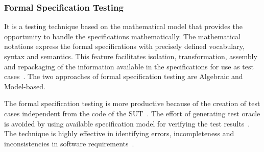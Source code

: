\subsubsection{Formal Specification Testing}
It is a testing technique based on the mathematical model that provides the opportunity to handle the specifications mathematically. The mathematical notations express the formal specifications with precisely defined vocabulary, syntax and semantics. This feature facilitates isolation, transformation, assembly and repackaging of the information available in the specifications for use as test cases~\cite{donat1997automating}. The two approaches of formal specification testing are Algebraic and Model-based.

The formal specification testing is more productive because of the creation of test cases independent from the code of the SUT~\cite{gaudel2010software}. The effort of generating test oracle is avoided by using available specification model for verifying the test results~\cite{bertolino2007software}. The technique is highly effective in identifying errors, incompleteness and inconsistencies in software requirements~\cite{sommerville2013software}.
  







